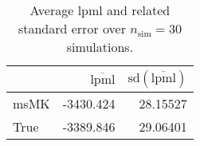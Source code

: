 \begin{table}[H]

\caption{Average lpml and related standard error over $n_{\text{sim}} = 30$ simulations.}
\centering
\begin{tabular}[t]{lrr}
\toprule
  & $\overbar{\text{lpml}}$ & $\text{sd}(\overbar{\text{lpml}})$\\
\midrule
msMK & -3430.424 & 28.15527\\
True & -3389.846 & 29.06401\\
\bottomrule
\end{tabular}
\end{table}